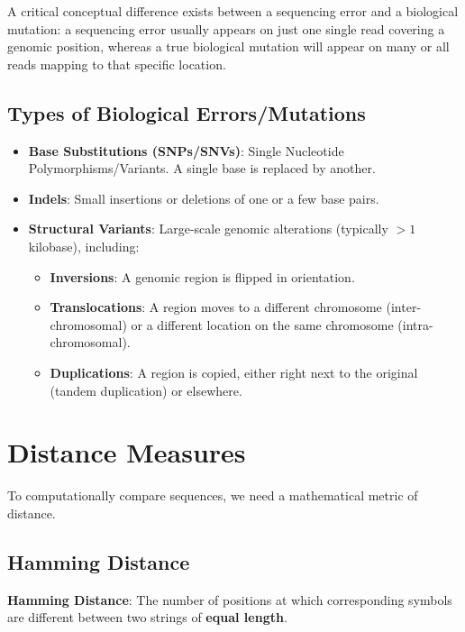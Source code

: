 \sta A critical conceptual difference exists between a sequencing error and a biological mutation: a sequencing error usually appears on just one single read covering a genomic position, whereas a true biological mutation will appear on many or all reads mapping to that specific location.

\subsection{Types of Biological Errors/Mutations}
\begin{itemize}
    \item \textbf{Base Substitutions (SNPs/SNVs)}: Single Nucleotide Polymorphisms/Variants. A single base is replaced by another. 
    \item \textbf{Indels}: Small insertions or deletions of one or a few base pairs.
    \item \textbf{Structural Variants}: Large-scale genomic alterations (typically $>1$ kilobase), including:
    \begin{itemize}
        \item \textbf{Inversions}: A genomic region is flipped in orientation.
        \item \textbf{Translocations}: A region moves to a different chromosome (inter-chromosomal) or a different location on the same chromosome (intra-chromosomal).
        \item \textbf{Duplications}: A region is copied, either right next to the original (tandem duplication) or elsewhere.
    \end{itemize}
\end{itemize}

\section{Distance Measures}

To computationally compare sequences, we need a mathematical metric of distance.

\subsection{Hamming Distance}

\begin{important}
    \textbf{Hamming Distance}: The number of positions at which corresponding symbols are different between two strings of \textbf{equal length}.
\end{important}


